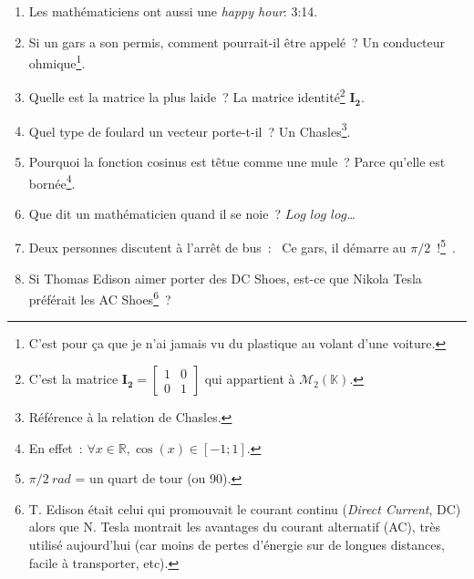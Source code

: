 \documentclass[10pt,a5paper,fullpage]{book}
\begin{document}
\begin{enumerate}
		\item Les mathématiciens ont aussi une \textit{happy hour}: 3:14. 
		\item Si un gars a son permis, comment pourrait-il être appelé~? Un conducteur ohmique\footnote{C'est pour ça que je n'ai jamais vu du plastique au volant d'une voiture.}. 
		\item Quelle est la matrice la plus laide~? La matrice identité\footnote{C’est la matrice $\mathbf{I_{2}} =  				
			\begin{bmatrix}
			1 & 0 \\0 & 1
			\end{bmatrix}$
			qui appartient à $\mathcal{M}_{2}(\mathbb{K})$.} $\mathbf{I_{2}}$.
		\item Quel type de foulard un vecteur porte-t-il~? Un Chasles\footnote{Référence à la relation de Chasles.}. 
		\item Pourquoi la fonction cosinus est têtue comme une mule~? Parce qu’elle est bornée\footnote{En effet~: $\forall x \in \mathbb{R}, \cos(x) \in [-1;1].$}.
		\item Que dit un mathématicien quand il se noie~? $Log$ $log$ $log$\ldots
		\item Deux personnes discutent à l’arrêt de bus~: \guillemotleft~Ce gars, il démarre au $\pi/2$~!\footnote{$\pi/2~rad$ = un quart de tour (ou 90\textdegree).}~\guillemotright. 
		\item Si Thomas Edison aimer porter des DC Shoes, est-ce que Nikola Tesla préférait les AC Shoes\footnote{T. Edison était celui qui promouvait le courant continu (\textit{Direct Current}, DC) alors que N. Tesla montrait les avantages du courant alternatif (AC), très utilisé aujourd'hui (car moins de pertes d'énergie sur de longues distances, facile à transporter, etc).}~?
		

\end{enumerate}
\end{document}
